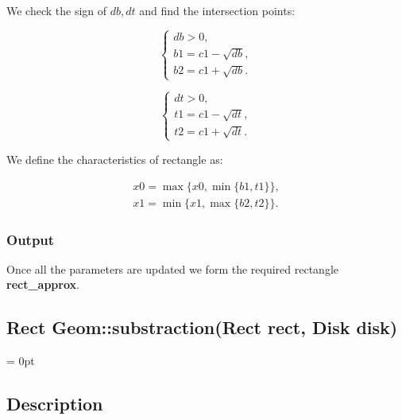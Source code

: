 \documentclass{report}
\begin{document}
\begin{itemize}
\begin{itemize}
		We check the sign of $db, dt$ and find the intersection points:
			
		\begin{equation}
			\begin{cases}
				db > 0,\\ 
				b1 = c1 - \sqrt {db},\\
				b2 = c1 + \sqrt {db}.
				\label{eq:b1b2}
			\end{cases}
		\end{equation}
		
		\begin{equation}
			\begin{cases}
				dt > 0,\\ 
				t1 = c1 - \sqrt {dt},\\
				t2 = c1 + \sqrt {dt}.
				\label{eq:t1t2}
			\end{cases}
		\end{equation}
			
		We define the characteristics of rectangle as:
		
			\begin{equation}
				\begin{gathered}
					x0 = \max\{x0, \min\{b1, t1\}\},\\
					x1 = \min\{x1, \max\{b2, t2\}\}.
			\end{gathered}
		\end{equation}
	
		\end{itemize}	
	\end{itemize}

	\subsubsection*{Output}


Once all the parameters are updated we form the required rectangle {\bfseries rect\_approx}.

\newpage
	
\begin{center} 
	\section*{Rect Geom::substraction(Rect rect, Disk disk)}
\end{center}
\parindent = 0pt
\subsection*{Description}
\end{document}
